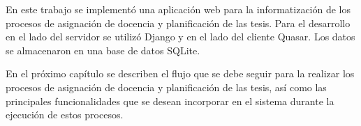 En este trabajo se implementó una aplicación web para la informatización de los procesos de 
asignación de docencia y planificación de las tesis. Para el desarrollo en el lado del servidor
se utilizó Django y en el lado del cliente Quasar. Los datos se 
almacenaron en una base de datos SQLite.

En el próximo capítulo se describen el flujo que se debe seguir para 
la realizar los procesos de asignación de docencia y planificación de las tesis,
así como las principales funcionalidades
que se desean incorporar en el sistema durante la ejecución de 
estos procesos.








